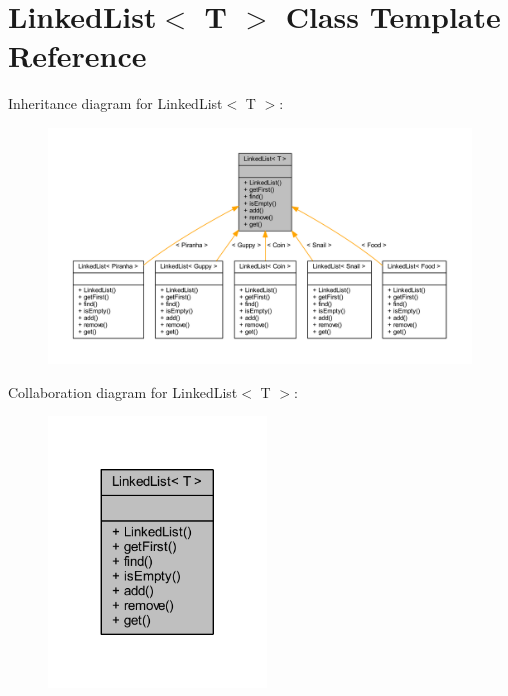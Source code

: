 \hypertarget{class_linked_list}{}\section{Linked\+List$<$ T $>$ Class Template Reference}
\label{class_linked_list}


Inheritance diagram for Linked\+List$<$ T $>$\+:
\nopagebreak
\begin{figure}[H]
\begin{center}
\leavevmode
\includegraphics[width=350pt]{class_linked_list__inherit__graph}
\end{center}
\end{figure}


Collaboration diagram for Linked\+List$<$ T $>$\+:
\nopagebreak
\begin{figure}[H]
\begin{center}
\leavevmode
\includegraphics[width=164pt]{class_linked_list__coll__graph}
\end{center}
\end{figure}
